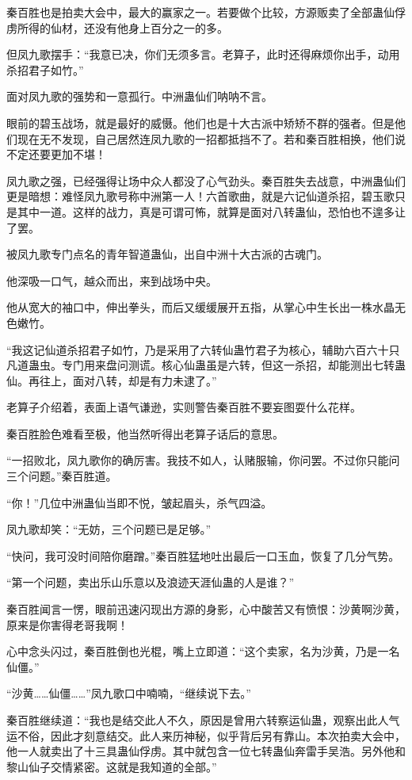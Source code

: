 \begin{this_body}
秦百胜也是拍卖大会中，最大的赢家之一。若要做个比较，方源贩卖了全部蛊仙俘虏所得的仙材，还没有他身上百分之一的多。

但凤九歌摆手：“我意已决，你们无须多言。老算子，此时还得麻烦你出手，动用杀招君子如竹。”

面对凤九歌的强势和一意孤行。中洲蛊仙们呐呐不言。

眼前的碧玉战场，就是最好的威慑。他们也是十大古派中矫矫不群的强者。但是他们现在无不发现，自己居然连凤九歌的一招都抵挡不了。若和秦百胜相换，他们说不定还要更加不堪！

凤九歌之强，已经强得让场中众人都没了心气劲头。秦百胜失去战意，中洲蛊仙们更是暗想：难怪凤九歌号称中洲第一人！六首歌曲，就是六记仙道杀招，碧玉歌只是其中一道。这样的战力，真是可谓可怖，就算是面对八转蛊仙，恐怕也不遑多让了罢。

被凤九歌专门点名的青年智道蛊仙，出自中洲十大古派的古魂门。

他深吸一口气，越众而出，来到战场中央。

他从宽大的袖口中，伸出拳头，而后又缓缓展开五指，从掌心中生长出一株水晶无色嫩竹。

“我这记仙道杀招君子如竹，乃是采用了六转仙蛊竹君子为核心，辅助六百六十只凡道蛊虫。专门用来盘问测谎。核心仙蛊虽是六转，但这一杀招，却能测出七转蛊仙。再往上，面对八转，却是有力未逮了。”

老算子介绍着，表面上语气谦逊，实则警告秦百胜不要妄图耍什么花样。

秦百胜脸色难看至极，他当然听得出老算子话后的意思。

“一招败北，凤九歌你的确厉害。我技不如人，认赌服输，你问罢。不过你只能问三个问题。”秦百胜道。

“你！”几位中洲蛊仙当即不悦，皱起眉头，杀气四溢。

凤九歌却笑：“无妨，三个问题已是足够。”

“快问，我可没时间陪你磨蹭。”秦百胜猛地吐出最后一口玉血，恢复了几分气势。

“第一个问题，卖出乐山乐意以及浪迹天涯仙蛊的人是谁？”

秦百胜闻言一愣，眼前迅速闪现出方源的身影，心中酸苦又有愤恨：沙黄啊沙黄，原来是你害得老哥我啊！

心中念头闪过，秦百胜倒也光棍，嘴上立即道：“这个卖家，名为沙黄，乃是一名仙僵。”

“沙黄……仙僵……”凤九歌口中喃喃，“继续说下去。”

秦百胜继续道：“我也是结交此人不久，原因是曾用六转察运仙蛊，观察出此人气运不俗，因此才刻意结交。此人来历神秘，似乎背后另有靠山。本次拍卖大会中，他一人就卖出了十三具蛊仙俘虏。其中就包含一位七转蛊仙奔雷手吴浩。另外他和黎山仙子交情紧密。这就是我知道的全部。”


\end{this_body}
